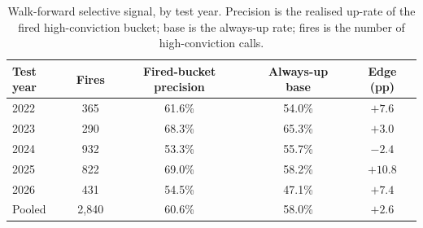 \documentclass{elektr}
\begin{document}
\begin{table}[h!]
\caption{Walk-forward selective signal, by test year. Precision is the realised up-rate of the fired high-conviction bucket; base is the always-up rate; fires is the number of high-conviction calls.}
\begin{center}
\begin{tabular}{lcccc}
\toprule
Test year & Fires & Fired-bucket precision & Always-up base & Edge (pp) \\
\midrule
2022 & 365 & 61.6\% & 54.0\% & $+7.6$ \\
2023 & 290 & 68.3\% & 65.3\% & $+3.0$ \\
2024 & 932 & 53.3\% & 55.7\% & $-2.4$ \\
2025 & 822 & 69.0\% & 58.2\% & $+10.8$ \\
2026 & 431 & 54.5\% & 47.1\% & $+7.4$ \\
\midrule
Pooled & 2{,}840 & 60.6\% & 58.0\% & $+2.6$ \\
\bottomrule
\end{tabular}
\label{tab:year}
\end{center}\vs{-6mm}
\end{table}
\end{document}
